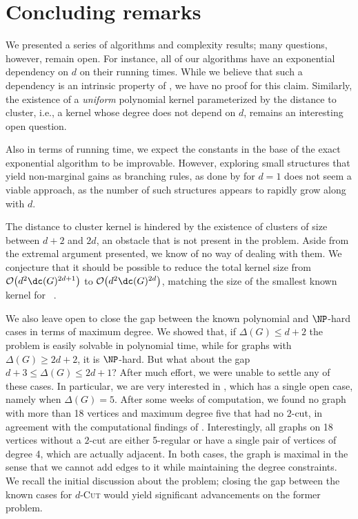 \section{Concluding remarks}
\label{sec:cuts_concl}

We presented a series of algorithms and complexity results; many questions, however, remain open.
For instance, all of our algorithms have an exponential dependency on $d$ on their running times.
While we believe that such a dependency is an intrinsic property of , we have no proof for this claim. Similarly, the existence of a \textit{uniform} polynomial kernel parameterized by the distance to cluster, i.e., a kernel whose degree does not depend on $d$, remains an interesting open question.

Also in terms of running time, we expect the constants in the base of the exact exponential algorithm to be improvable. However, exploring small structures that yield non-marginal gains as branching rules, as done by \cite{matching_cut_ipec} for $d=1$ does not seem a viable approach, as the number of such structures appears to rapidly grow along with $d$.



The distance to cluster kernel is hindered by the existence of clusters of size between $d+2$ and $2d$, an obstacle that is not present in the  problem.
Aside from the extremal argument presented, we know of no way of dealing with them.
We conjecture that it should be possible to reduce the total kernel size from $\bigO{d^2\dc(G)^{2d+1}}$ to $\bigO{d^2\dc(G)^{2d}}$, matching the size of the smallest known kernel for ~\cite{matching_cut_ipec}.

We also leave open to close the gap between the known polynomial and $\NP$-hard cases in terms of maximum degree.
We showed that, if $\Delta(G) \leq d+2$ the problem is easily solvable in polynomial time, while for graphs with $\Delta(G) \geq 2d+2$, it is $\NP$-hard.
But what about the gap $d+3 \leq \Delta(G) \leq 2d+1$?
After much effort, we were unable to settle any of these cases.
In particular, we are very interested in ,  which has a single open case, namely when $\Delta(G) = 5$.
After some weeks of computation, we found no graph with more than 18 vertices and maximum degree five that had no $2$-cut, in agreement with the computational findings of \cite{internal_partition_regular6}.
Interestingly, all graphs on 18 vertices without a $2$-cut are either 5-regular or have a single pair of vertices of degree 4, which are actually adjacent.
In both cases, the graph is maximal in the sense that we cannot add edges to it while maintaining the degree constraints.
We recall the initial discussion about the  problem; closing the gap between the known cases for \textsc{$d$-Cut} would yield significant advancements on the former problem.


